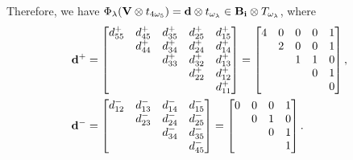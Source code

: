 \documentclass[leqno,11pt]{amsart}
\numberwithin{equation}{section}
\newcommand{\bs}{\boldsymbol}
\newcommand{\B}{\mathbf{B}}
\newcommand{\bi}{\bs{\rm i}}
\newcommand{\la}{\lambda}
\begin{document}
\noindent Therefore, we have $\Phi_\la({\bf V}\otimes t_{4\omega_5})={\bf d}\otimes t_{\omega_\la}\in \B_{\bi}\otimes T_{\omega_\la}$, where
\begin{equation*}
\begin{split}
{\bf d}^+ &=
\begin{bmatrix}
d^+_{55} & d^+_{45} & d^+_{35} & d^+_{25} & d^+_{15} \\
  & d^+_{44} & d^+_{34} & d^+_{24} & d^+_{14} \\
 &   & d^+_{33} & d^+_{32} & d^+_{13} \\
 &   &   & d^+_{22} & d^+_{12} \\
  &   &   &   & d^+_{11} \\
\end{bmatrix}=
\begin{bmatrix}
4 & 0 & 0 & 0 & 1 \\
  & 2 & 0 & 0 & 1 \\
  &   & 1 & 1 & 0 \\
  &   &   & 0 & 1 \\
  &   &   &   & 0 \\
\end{bmatrix},\\
{\bf d}^-&=
\begin{bmatrix}
d^-_{12} & d^-_{13} & d^-_{14} & d^-_{15}   \\
         & d^-_{23} & d^-_{24} & d^-_{25}   \\
         &          & d^-_{34} & d^-_{35}   \\
         &          &          & d^-_{45}   \\
\end{bmatrix}=
\begin{bmatrix}
0 & 0 & 0 & 1   \\
  & 0 & 1 & 0   \\
  &   & 0 & 1  \\
  &   &   & 1   \\
\end{bmatrix}. \\
\end{split}
\end{equation*}\vskip 5mm
\end{document}
